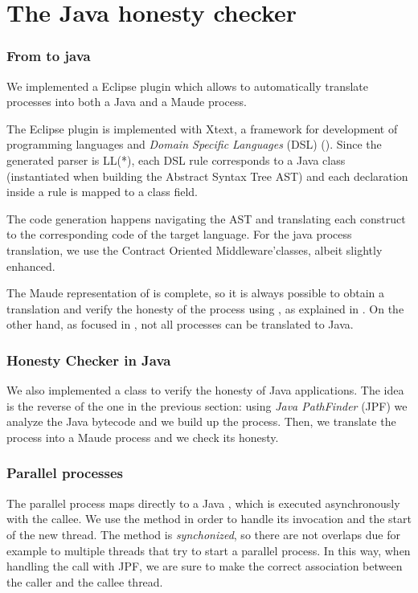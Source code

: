 
\section{The Java honesty checker}\label{sec:java-honesty}



\subsubsection{From \coco to java }
We implemented a \coco Eclipse plugin which allows to automatically
translate \coco processes into both a Java and a Maude process. 

The \coco Eclipse plugin is implemented with Xtext, a framework for
development of programming languages and \textit{Domain Specific
  Languages} (DSL) ().
Since the generated parser is LL(*), each DSL rule corresponds to a
Java class (instantiated when building the Abstract Syntax Tree AST) and
each declaration inside a rule is mapped to a class field.

The code generation happens navigating the AST and translating each
\coco construct to the corresponding code of the target language.
For the java process translation, we use  the Contract Oriented
Middleware'classes, albeit slightly enhanced.

The Maude representation of \coco is complete, so it is always possible to
obtain a translation and verify the honesty of the process using
\cite{verifiable}, as explained in . On the
other hand, as focused in , not all
processes can be translated to Java.

\subsubsection{Honesty Checker in Java}
We also implemented a class  to verify the
honesty of Java applications. The idea is the reverse of the one in
the previous section: using \textit{Java PathFinder} (JPF) we analyze
the Java bytecode and we build up the \coco process. Then, we
translate the \coco process into a Maude process and we check its honesty.


\subsubsection{Parallel processes}\label{sec:java-parallel}
The \coco parallel process maps directly to a Java
, which is executed asynchronously with the
callee. We use the method
 in order to handle its
invocation and the start of the new thread. The method is
\emph{synchonized}, so there are not overlaps due for example to
multiple threads that try to start a parallel process. In this way,
when handling the call with JPF, we are sure to make the correct
association between the caller and the callee thread.

